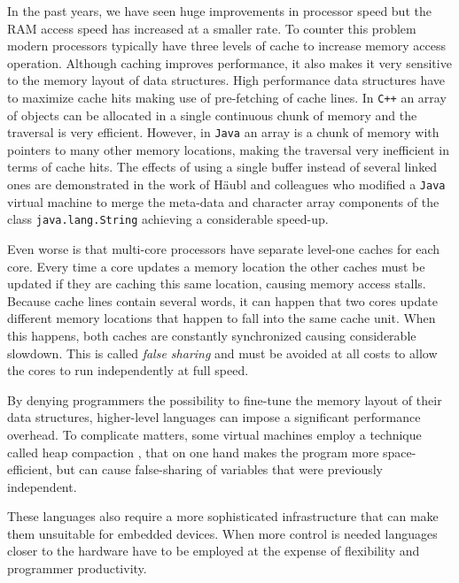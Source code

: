 In the past years, we have seen huge improvements in processor speed but the RAM access speed has increased at
a smaller rate. To counter this problem modern processors typically have three levels of cache to increase
memory access operation. Although caching improves performance, it also makes it very sensitive to the memory
layout of data structures. High performance data structures have to maximize cache hits making use of
pre-fetching of cache lines. In \texttt{C++} an array of objects can be allocated in a single continuous chunk of memory
and the traversal is very efficient. However, in \texttt{Java} an array is a chunk of memory with pointers to
many other memory locations, making the traversal very inefficient in terms of cache hits. The effects of
using a single buffer instead of several linked ones are demonstrated in the work of Häubl and colleagues who
modified a \texttt{Java} virtual machine to merge the meta-data and character array components of the class
\texttt{java.lang.String} achieving a considerable speed-up.

Even worse is that multi-core processors have separate level-one caches for each core. Every time a
core updates a memory location the other caches must be updated if they are caching this same location, causing
memory access stalls. Because cache lines contain several words, it can happen that two cores update
different memory locations that happen to fall into the same cache unit. When this happens, both caches
are constantly synchronized causing considerable slowdown. This is called \emph{false sharing} and must
be avoided at all costs to allow the cores to run independently at full speed.

By denying programmers the possibility to fine-tune the memory layout of their data structures,
higher-level languages can impose a significant performance overhead. To complicate matters, some virtual machines
employ a technique called heap compaction \cite{Clarke}, that on one hand makes the program more space-efficient, but can
cause false-sharing of variables that were previously independent.

These languages also require a more sophisticated infrastructure that can make them unsuitable for embedded devices.
When more control is needed languages closer to the hardware have to be employed at the expense
of flexibility and programmer productivity.

